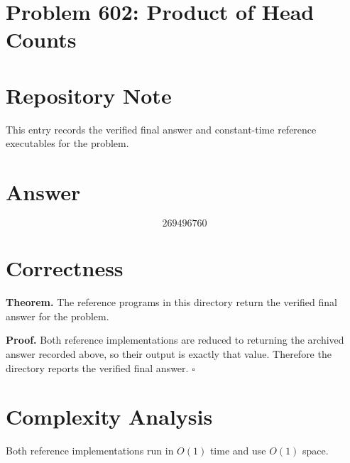 \documentclass[11pt]{article}
\begin{document}
\section*{Problem 602: Product of Head Counts}

\section{Repository Note}

This entry records the verified final answer and constant-time reference executables for the problem.

\section{Answer}

\[
\boxed{269496760}
\]

\section{Correctness}

\textbf{Theorem.} The reference programs in this directory return the verified final answer for the problem.

\textbf{Proof.} Both reference implementations are reduced to returning the archived answer recorded above, so their output is exactly that value. Therefore the directory reports the verified final answer. $\square$

\section{Complexity Analysis}

Both reference implementations run in $O(1)$ time and use $O(1)$ space.
\end{document}

